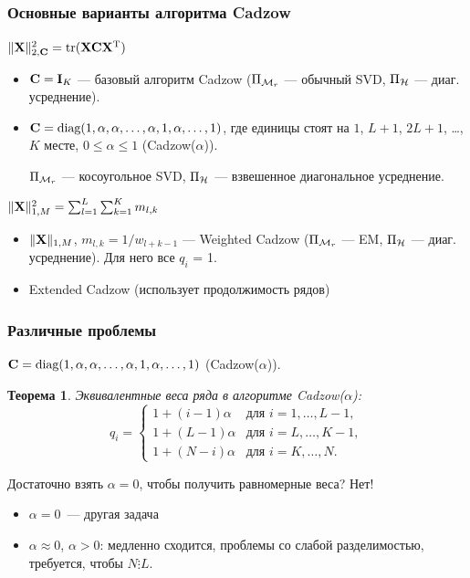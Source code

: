 \documentclass[unicode, notheorems]{beamer}
\newtheorem{theorem}{Теорема}
\begin{document}
\begin{frame}
	\frametitle{Основные варианты алгоритма Cadzow}
	$\|\mathbf{X}\|_{2, \mathbf{C}}^2 = \text{tr}(\mathbf{X} \mathbf{C} \mathbf{X}^{\mathrm{T}})$
	\begin{itemize}
		\item $\mathbf{C} = \mathbf{I}_K$ --- базовый алгоритм Cadzow ($\Pi_{\mathcal{M}_r}$ --- обычный SVD, $\Pi_{\mathcal{H}}$ --- диаг. усреднение).
		\item $\mathbf{C} = \text{diag}(1, \alpha, \alpha, \ldots, \alpha, 1, \alpha, \ldots, 1)$,
		где единицы стоят на $1$, $L + 1$, $2L + 1$, \ldots , $K$ месте, $0 \le \alpha \le 1$ (Cadzow($\alpha$)).
		
		$\Pi_{\mathcal{M}_r}$ --- косоугольное SVD, $\Pi_{\mathcal{H}}$ --- взвешенное диагональное усреднение.
	\end{itemize}
	
	$\|\mathbf{X}\|^2_{1, M} =  \sum_{l = 1}^L \sum_{k = 1}^K m_{l, k}$
	\begin{itemize}
		\item $\|\mathbf{X}\|_{1, M}$, $m_{l, k} = 1 / w_{l + k - 1}$ --- Weighted Cadzow ($\Pi_{\mathcal{M}_r}$ --- EM, $\Pi_{\mathcal{H}}$ --- диаг. усреднение). Для него все $q_i$ = 1.
		\item Extended Cadzow (использует продолжимость рядов)
	\end{itemize}
	
	\vspace{0.3cm}
	
\end{frame}

\begin{frame}
	\frametitle{Различные проблемы}
	 $\mathbf{C} = \text{diag}(1, \alpha, \alpha, \ldots, \alpha, 1, \alpha, \ldots, 1)$ (Cadzow($\alpha$)).
	\begin{theorem}
		Эквивалентные веса ряда в алгоритме Cadzow($\alpha$):
		\begin{equation*}
		q_i = \begin{cases}
		1 + (i - 1) \alpha & \text{для $i = 1, \ldots, L-1,$}\\
		1 + (L - 1) \alpha & \text{для $i = L, \ldots, K-1,$}\\
		1 + (N - i) \alpha & \text{для $i = K, \ldots, N.$}
		\end{cases}
	    \end{equation*}
	\end{theorem}
	
	Достаточно взять $\alpha = 0$, чтобы получить равномерные веса? Нет! 
	\begin{itemize}
		\item  $\alpha = 0$~--- другая задача
		\item $\alpha \approx 0$, $\alpha > 0$: медленно сходится, проблемы со слабой разделимостью, требуется, чтобы $N \vdots L$.
	\end{itemize}

\end{frame}
\end{document}
